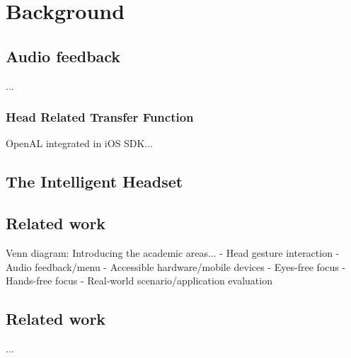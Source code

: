 \chapter{Background}

\section{}

\section{Audio feedback}
...

\subsection{Head Related Transfer Function}
OpenAL integrated in iOS SDK...

\section{The Intelligent Headset}

\section{Related work}
Venn diagram: Introducing the academic areas...
- Head gesture interaction
- Audio feedback/menu
- Accessible hardware/mobile devices
- Eyes-free focus
- Hands-free focus
- Real-world scenario/application evaluation

\section{Related work}
...


